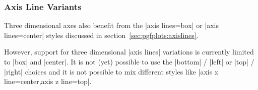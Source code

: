 


\subsubsection{Axis Line Variants}
\label{sec:pgfplots:axislines:3d}
Three dimensional axes also benefit from the |axis lines=box| or |axis lines=center| styles discussed in section~\ref{sec:pgfplots:axislines}.

\begin{codeexample}[]
\end{codeexample}

However, support for three dimensional |axis lines| variations is currently limited to |box| and |center|. It is not (yet) possible to use the |bottom| / |left| or |top| / |right| choices and it is not possible to mix different styles like |axis x line=center,axis z line=top|.


